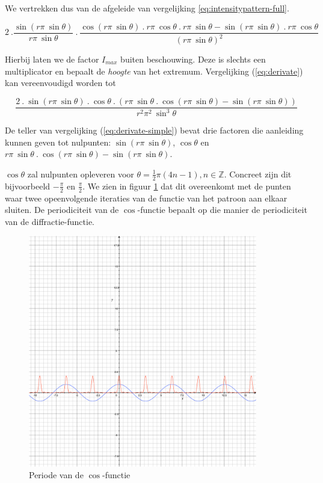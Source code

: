 \documentclass[12pt,a4paper]{article}
\begin{document}
We vertrekken dus van de afgeleide van vergelijking \ref{eq:intensitypattern-full}. 

\begin{equation} \label{eq:derivate}
2 \ . \frac{\sin( r \pi \ \sin \theta)}{r \pi \ \sin \theta} \ . \ \frac{\cos(r \pi \ \sin \theta)\ . \ r \pi \ \cos \theta \ . \ r \pi \ \sin \theta - \sin(r \pi \ \sin \theta) \ . \ r \pi \ \cos \theta}{(r \pi \ \sin \theta)^2}
\end{equation}

Hierbij laten we de factor $I_{max}$ buiten beschouwing. Deze is slechts een multiplicator en bepaalt de \emph{hoogte} van het extremum. Vergelijking (\ref{eq:derivate}) kan vereenvoudigd worden tot

\begin{equation} \label{eq:derivate-simple}
\frac{2 \ . \ \sin( r \pi \ \sin \theta) \ . \ \cos \theta \ . \ ( r \pi \ \sin \theta \ . \ \cos( r \pi \ \sin \theta) - \sin( r \pi \ \sin \theta))}{r^2 \pi^2 \ \sin^3 \theta}
\end{equation}

De teller van vergelijking (\ref{eq:derivate-simple}) bevat drie factoren die aanleiding kunnen geven tot nulpunten: $\sin( r \pi \ \sin \theta)$, $\cos\theta$ en $r \pi \ \sin \theta \ . \ \cos( r \pi \ \sin \theta) - \sin( r \pi \ \sin \theta)$.

$\cos\theta$ zal nulpunten opleveren voor $\theta = \frac{1}{2} \pi (4n-1), n \in \mathbb{Z}$. Concreet zijn dit bijvoorbeeld $-\frac{\pi}{2}$ en $\frac{\pi}{2}$. We zien in figuur \ref{fig:cosine-period} dat dit overeenkomt met de punten waar twee opeenvolgende iteraties van de functie van het patroon aan elkaar sluiten. De periodiciteit van de $\cos$-functie bepaalt op die manier de periodiciteit van de diffractie-functie.

\begin{figure}
\begin{center}
 \includegraphics[width=100mm]{resources/cosine-period.pdf}
 \caption{Periode van de $\cos$-functie}
  \label{fig:cosine-period}
\end{center}
\end{figure}
\end{document}
